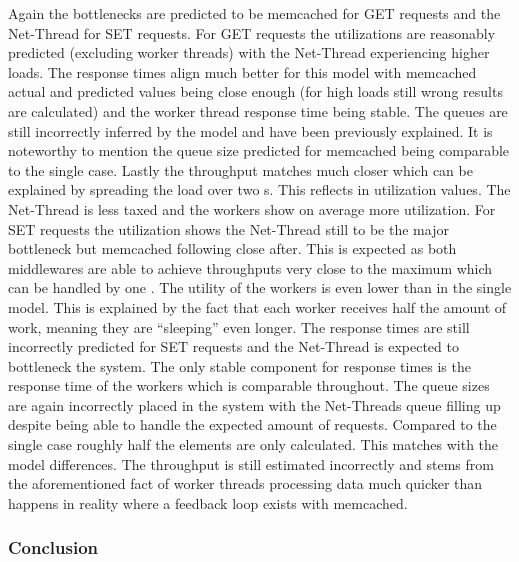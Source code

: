                 Again the bottlenecks are predicted to be memcached for GET requests and the Net-Thread for SET
                requests. For GET requests the utilizations are reasonably predicted (excluding worker threads) with the
                Net-Thread experiencing higher loads. The response times align much better for this model with memcached
                actual and predicted values being close enough (for high loads still wrong results are calculated) and
                the worker thread response time being stable. The queues are still incorrectly inferred by the model and
                have been previously explained. It is noteworthy to mention the queue size predicted for memcached being
                comparable to the single \mw{} case. Lastly the throughput matches much closer which can be explained by
                spreading the load over two \mw{}s. This reflects in utilization values. The Net-Thread is less taxed
                and the workers show on average more utilization.\newline
                For SET requests the utilization shows the Net-Thread still to be the major bottleneck but memcached
                following close after. This is expected as both middlewares are able to achieve throughputs very close
                to the maximum which can be handled by one \srv{}. The utility of the workers is even lower than in the
                single \mw{} model. This is explained by the fact that each worker receives half the amount of work,
                meaning they are ``sleeping'' even longer. The response times are still incorrectly predicted for SET
                requests and the Net-Thread is expected to bottleneck the system. The only stable component for response
                times is the response time of the workers which is comparable throughout. The queue sizes are again
                incorrectly placed in the system with the Net-Threads queue filling up despite being able to handle the
                expected amount of requests. Compared to the single \mw{} case roughly half the elements are only
                calculated. This matches with the model differences. The throughput is still estimated incorrectly and
                stems from the aforementioned fact of worker threads processing data much quicker than happens in
                reality where a feedback loop exists with memcached.

                \subsubsection{Conclusion\label{subsubsec:7_noq_conclusion}}

